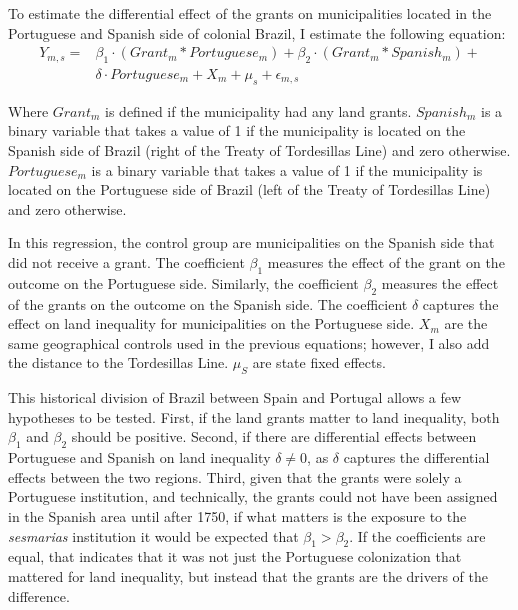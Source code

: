 \documentclass[11pt]{article}
\begin{document}
To estimate the differential effect of the grants on municipalities located in the Portuguese and Spanish side of colonial Brazil, I estimate the following equation:
\begin{equation}
  \label{eqn:tordesillas}
  \begin{split}
  Y_{m,s} = & \beta_1 \cdot (Grant_m  * Portuguese_m) + \beta_2 \cdot (Grant_m * Spanish_m) + \\
  & \delta \cdot  Portuguese_m + X_{m} + \mu_s + \epsilon_{m,s}
  \end{split}
\end{equation}

Where $Grant_m$ is defined if the municipality had any land grants. 
$Spanish_m$ is a binary variable that takes a value of 1 if the municipality is located on the Spanish side of Brazil (right of the Treaty of Tordesillas Line) and zero otherwise.
$Portuguese_m$ is a binary variable that takes a value of 1 if the municipality is located on the Portuguese side of Brazil (left of the Treaty of Tordesillas Line) and zero otherwise. 

In this regression, the control group are municipalities on the Spanish side that did not receive a grant.
The coefficient $\beta_1$ measures the effect of the grant on the outcome on the Portuguese side. 
Similarly, the coefficient $\beta_2$ measures the effect of the grants on the outcome on the Spanish side.
The coefficient $\delta$ captures the effect on land inequality for municipalities on the Portuguese side.
$X_m$ are the same geographical controls used in the previous equations; however, I also add the distance to the Tordesillas Line.
$\mu_S$ are state fixed effects.

This historical division of Brazil between Spain and Portugal allows a few hypotheses to be tested.
First, if the land grants matter to land inequality, both $\beta_1$ and $\beta_2$ should be positive.
Second, if there are differential effects between Portuguese and Spanish on land inequality $\delta \neq 0$, as $\delta$ captures the differential effects between the two regions.
Third, given that the grants were solely a Portuguese institution, and technically, the grants could not have been assigned in the Spanish area until after 1750, if what matters is the exposure to the \textit{sesmarias} institution it would be expected that $\beta_1 > \beta_2$. 
If the coefficients are equal, that indicates that it was not just the Portuguese colonization that mattered for land inequality, but instead that the grants are the drivers of the difference.
\end{document}
